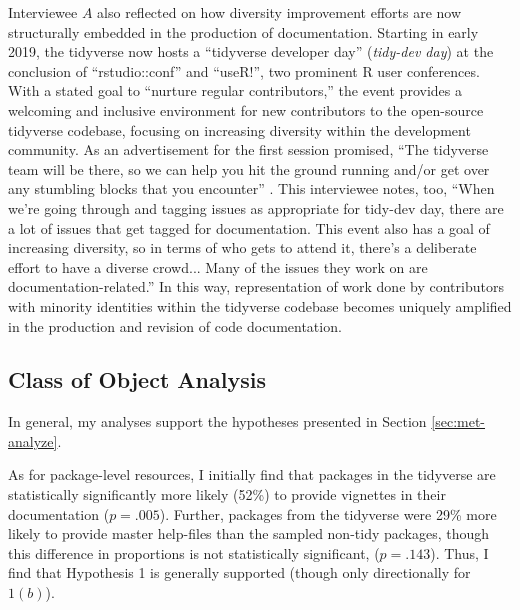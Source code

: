 Interviewee $A$ also reflected on how diversity improvement efforts are now structurally embedded in the production of documentation. Starting in early 2019, the tidyverse now hosts a ``tidyverse developer day'' (\textit{tidy-dev day}) at the conclusion of ``rstudio::conf'' and ``useR!'', two prominent R user conferences. With a stated goal to ``nurture regular contributors,'' the event provides a welcoming and inclusive environment for new contributors to the open-source tidyverse codebase, focusing on increasing diversity within the development community. As an advertisement for the first session promised, ``The tidyverse team will be there, so we can help you hit the ground running and/or get over any stumbling blocks that you encounter'' \cite{averick_tidyverse_2018}. This interviewee notes, too, ``When we’re going through and tagging issues as appropriate for tidy-dev day, there are a lot of issues that get tagged for documentation. This event also has a goal of increasing diversity, so in terms of who gets to attend it, there’s a deliberate effort to have a diverse crowd... Many of the issues they work on are documentation-related.'' In this way, representation of work done by contributors with minority identities within the tidyverse codebase becomes uniquely amplified in the production and revision of code documentation.

\subsection{Class of Object Analysis}\label{sec:results-coa}

In general, my analyses support the hypotheses presented in Section \ref{sec:met-analyze}.

As for package-level resources, I initially find that packages in the tidyverse are statistically significantly more likely (52\%) to provide vignettes in their documentation ($p = .005$). Further, packages from the tidyverse were 29\% more likely to provide master help-files than the sampled non-tidy packages, though this difference in proportions is not statistically significant, ($p = .143$). Thus, I find that Hypothesis 1 is generally supported (though only directionally for $1(b)$). 

